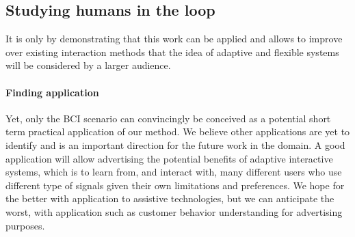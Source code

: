 


\subsection*{Studying humans in the loop}
\label{chapter:limitations:userstudies}


It is only by demonstrating that this work can be applied and allows to improve over existing interaction methods that the idea of adaptive and flexible systems will be considered by a larger audience.

\paragraph{Finding application} Yet, only the BCI scenario can convincingly be conceived as a potential short term practical application of our method. We believe other applications are yet to identify and is an important direction for the future work in the domain. A good application will allow advertising the potential benefits of adaptive interactive systems, which is to learn from, and interact with, many different users who use different type of signals given their own limitations and preferences. We hope for the better with application to assistive technologies, but we can anticipate the worst, with application such as customer behavior understanding for advertising purposes.





